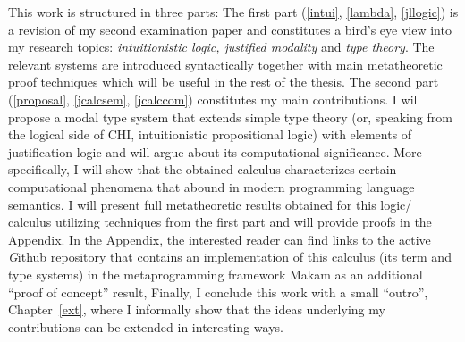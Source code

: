            This work  is structured in three parts: 
           The first part (\cref{intui}, \cref{lambda}, \cref{jllogic}) is a revision of my second examination paper and constitutes 
           a bird's eye view into my 
           research topics:  
           \emph{intuitionistic logic, justified modality} and \emph{type theory}. 
           The relevant systems are introduced syntactically together with main 
            metatheoretic proof techniques which will be useful 
           in the rest of the thesis.
           The second part (\cref{proposal}, \cref{jcalcsem}, \cref{jcalccom}) 
           constitutes my main contributions.
           I will propose  
           a modal type system that extends simple type theory
            (or, speaking from the logical side of \ac{CHI}, 
           intuitionistic propositional logic) with elements of
            justification logic and will argue about its computational significance. 
            More specifically, I will show  
           that the obtained calculus characterizes  certain 
           computational phenomena that abound in modern programming language semantics. 
           I will present full metatheoretic
           results obtained for this logic/ calculus utilizing techniques from the first part 
           and will provide proofs in the Appendix. 
           In the Appendix, the interested reader can find links to the active 
           {\textit Github} repository 
           that contains an implementation of  this calculus 
           (its term and type systems)
           in the metaprogramming framework {\sf Makam} 
           as an additional  ``proof of concept'' result,  
           Finally, I conclude this work with a small ``outro'', Chapter~\ref{ext},
           where I informally show that the ideas underlying my contributions 
           can be extended in interesting ways.




